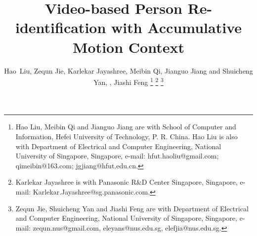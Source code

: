 \documentclass[journal]{IEEEtran}
\begin{document}
\title{Video-based Person Re-identification with Accumulative Motion Context}
%
%
%

\author{Hao~Liu, Zequn Jie, Karlekar Jayashree, Meibin Qi, Jianguo Jiang
	and Shuicheng Yan, , Jiashi Feng%
	\thanks{Hao Liu, Meibin Qi and Jianguo Jiang are with School of Computer and Information, Hefei University of Technology, P. R. China. Hao Liu is also with Department of Electrical and Computer Engineering, National University of Singapore, Singapore, e-mail: hfut.haoliu@gmail.com; qimeibin@163.com; jgjiang@hfut.edu.cn.}%
	\thanks{Karlekar Jayashree is with Panasonic R\&D Center Singapore, Singapore, e-mail: Karlekar.Jayashree@sg.panasonic.com. }
	\thanks{Zequn Jie, Shuicheng Yan and Jiashi Feng are with Department of Electrical and Computer Engineering, National University of Singapore, Singapore, e-mail: zequn.nus@gmail.com, eleyans@nus.edu.sg, elefjia@nus.edu.sg.}}%


% 
%
\end{document}
